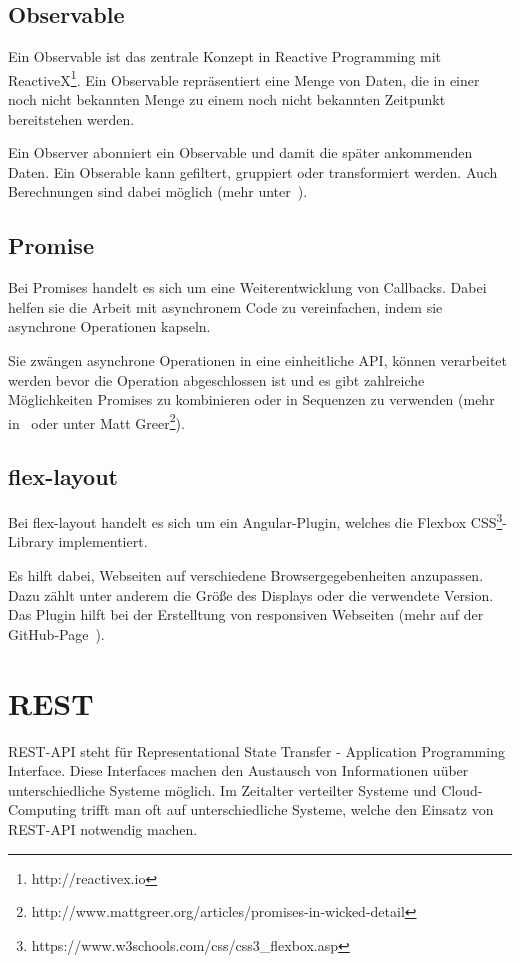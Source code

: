 \subsection{Observable}
Ein Observable ist das zentrale Konzept in Reactive Programming mit ReactiveX\footnote{http://reactivex.io}. Ein
Observable repräsentiert eine Menge von Daten, die in einer noch nicht bekannten Menge zu einem noch nicht bekannten
Zeitpunkt bereitstehen werden.

Ein Observer abonniert ein Observable und damit die später ankommenden Daten. Ein Obserable kann gefiltert, gruppiert
oder transformiert werden. Auch Berechnungen sind dabei möglich (mehr unter~\cite{book_grundlagen_observable}).

\subsection{Promise}
Bei Promises handelt es sich um eine Weiterentwicklung von Callbacks. Dabei helfen sie die Arbeit mit asynchronem Code
zu vereinfachen, indem sie asynchrone Operationen kapseln.

Sie zwängen asynchrone Operationen in eine einheitliche API, können verarbeitet werden bevor die Operation abgeschlossen
ist und es gibt zahlreiche Möglichkeiten Promises zu kombinieren oder in Sequenzen zu verwenden (mehr
in~\cite{book_grundlagen_promises} oder unter Matt Greer\footnote{http://www.mattgreer.org/articles/promises-in-wicked-detail}).

\subsection{flex-layout}
Bei flex-layout handelt es sich um ein Angular-Plugin, welches die Flexbox
CSS\footnote{https://www.w3schools.com/css/css3\_flexbox.asp}-Library implementiert.

Es hilft dabei, Webseiten auf verschiedene Browsergegebenheiten anzupassen. Dazu zählt unter anderem die Größe des
Displays oder die verwendete Version. Das Plugin hilft bei der Erstelltung von responsiven Webseiten (mehr auf der
GitHub-Page~\cite{online_grundlagen_flexlayout}).

\section{REST}
REST-API steht für Representational State Transfer - Application Programming Interface. Diese Interfaces machen den
Austausch von Informationen uüber unterschiedliche Systeme möglich. Im Zeitalter verteilter Systeme und Cloud-Computing
trifft man oft auf unterschiedliche Systeme, welche den Einsatz von REST-API notwendig machen.

